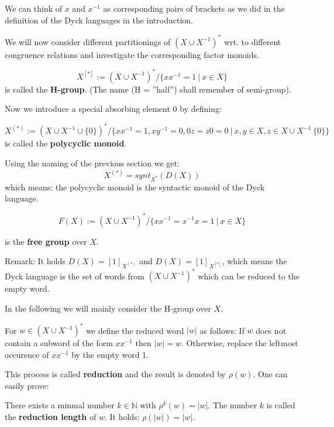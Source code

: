 We can think of $x$ and $x^{-1}$ as corresponding pairs of
brackets as we did in the definition of the Dyck languages in the introduction.

We will now consider different partitionings of $(X \cup X^{-1})^*$ wrt. to
different congruence relations and investigate the corresponding factor monoids.

\begin{definition}
\[ X^{[*]} := (X \cup X^{-1})^* / \{ x x^{-1} = 1\ |\ x \in X \} \]
is called the {\bf H-group}. (The name (H = ''half'') shall remember of
semi-group).
\end{definition}

Now we introduce a special absorbing element $0$ by defining:
\begin{definition}
\[ X^{(*)} := (X \cup X^{-1} \cup \{0\})^* / \{ x x^{-1} = 1, x y^{-1} = 0, 0 z
= z 0 = 0\ |\ x,y \in X, z \in X \cup X^{-1} \ \{0\} \} \]
is called the {\bf polycyclic monoid}.
\end{definition}

Using the naming of the previous section we get:
\[ X^{(*)} = synt_{X^*}(D(X)) \]
which means: the polycyclic monoid is the syntactic monoid of the Dyck language.

\begin{definition}
\[ F(X) := (X \cup X^{-1})^* / \{ x x^{-1} = x^{-1} x = 1 \ |\ x \in X \} \]
\end{definition}
is the {\bf free group} over $X$.

Remark: It holds $D(X) = [1]_{X^{(*)}}$ and $D(X) = [1]_{X^{[*]}}$, which means
the Dyck language is the set of words from $(X \cup X^{-1})^*$ which can be
reduced to the empty word.

In the following we will mainly consider the H-group over $X$.

For $w \in (X \cup X^{-1})^*$ we define the reduced word $|w|$ as follows: If
$w$ does not contain a subword of the form $x x^{-1}$ then $|w| = w$. Otherwise,
replace the leftmost occurence of $x x^{-1}$ by the empty word 1.

This process is called {\bf reduction} and the result is denoted by $\rho(w)$.
One can easily prove:

\begin{lemma}
There exists a minmal number $k \in \mathbb{N}$ with $\rho^k(w) = |w|$. The
number $k$ is called the {\bf reduction length} of $w$. It holds: $\rho(|w|) =
|w|$.
\end{lemma}

